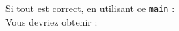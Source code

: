 Si tout est correct, en utilisant ce \lstinline{main} : \\

 

Vous devriez obtenir : \\

 

\newpage
\begin{comment}
	\section{Héritage en Python \optionnel}

	\begin{Exercice}[10 minutes]\textbf{Classe Point (Suite)}

	Dans la série dernière, vous avez rencontré un exemple de classe en Python. Celui-là représente un point de 2 dimensions, x et y, ainsi que des calculs basiques des points 2D. Pour cet exercice, vous allez implémenter une classe des points de 3 dimensions en utilisant de l'héritage sur la classe \textbf{Point} qu'on a implémentée! À travers cet exercice, nous voudrions également vous présenter une syntaxe en Python qui concerne l'utilisation des 'décorateurs'.\\


	Avant de commencer, nous voudrions attirer votre attentions sur les points suivants de la classe mère Point:
	\begin{itemize}
		\item Tout d'abord, nous avons récrit la classe de la semaine dernière pour utiliser les 'decorators' en Python. Par exemple, vous trouverez une explication \href{https://python-reference.readthedocs.io/en/latest/docs/property/setter.html}{\textcolor{cyan}{ici}} pour le décorateur \textbf{setter}. Lisez bien les documentations et le code suivant pour comprendre l'usage de ces décorateurs.
		\item Nous avons changé le nom de la méthode \textbf{distance()} pour \textbf{euclidean\_distance()} pour la distinguer des autres types de distance. 
		\item Traiter la classe \textbf{Point} comme mère et faire l'hériter depuis la classe \textbf{Point3D} n'est pas la meilleure structure d'un programme Python, mais on la garde pour le moment afin de vous montrer comment les méthodes de classe mère peuvent être manipulées dans une classe fille.
	\end{itemize}


\end{comment}
